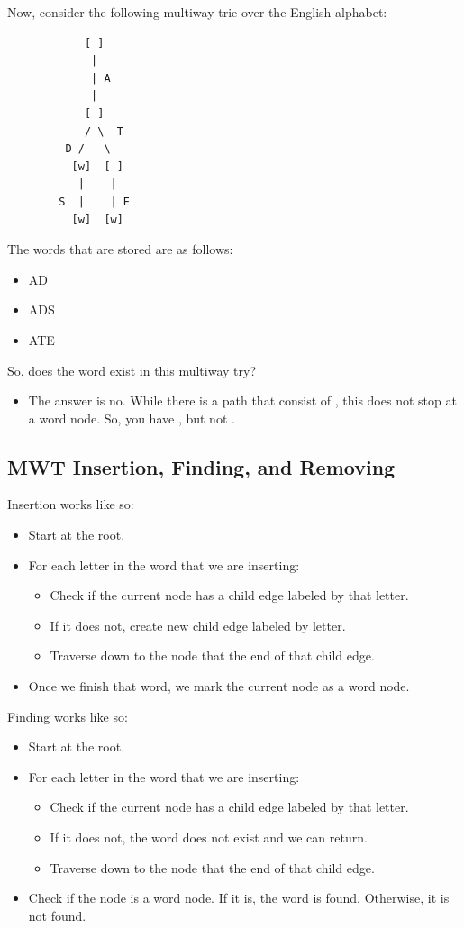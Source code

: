 \documentclass[letterpaper]{article}
\begin{document}
Now, consider the following multiway trie over the English alphabet: 
\begin{verbatim}
            [ ]
             | 
             | A
             |
            [ ]
            / \  T
         D /   \ 
          [w]  [ ]
           |    |
        S  |    | E
          [w]  [w]
\end{verbatim}
The words that are stored are as follows: 
\begin{itemize}
    \item AD 
    \item ADS 
    \item ATE 
\end{itemize}
So, does the word  exist in this multiway try? 
\begin{itemize}
    \item The answer is no. While there is a path that consist of , this does not stop at a word node. So, you have , but not .
\end{itemize}

\subsection{MWT Insertion, Finding, and Removing}
Insertion works like so: 
\begin{itemize}
    \item Start at the root.
    \item For each letter in the word that we are inserting: 
    \begin{itemize}
        \item Check if the current node has a child edge labeled by that letter. 
        \item If it does not, create new child edge labeled by letter.
        \item Traverse down to the node that the end of that child edge. 
    \end{itemize}
    \item Once we finish that word, we mark the current node as a word node. 
\end{itemize}

Finding works like so: 
\begin{itemize}
    \item Start at the root. 
    \item For each letter in the word that we are inserting: 
    \begin{itemize}
        \item Check if the current node has a child edge labeled by that letter. 
        \item If it does not, the word does not exist and we can return. 
        \item Traverse down to the node that the end of that child edge. 
    \end{itemize}
    \item Check if the node is a word node. If it is, the word is found. Otherwise, it is not found. 
\end{itemize}
\end{document}

